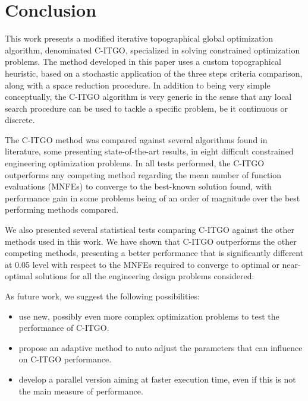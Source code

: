 \section{Conclusion} \label{sec:Conclusion}

This work presents a modified iterative topographical global optimization algorithm, denominated C-ITGO, specialized in solving constrained optimization problems. The method developed in this paper uses a custom topographical heuristic, based on a stochastic application of the three steps criteria comparison, along with a space reduction procedure. In addition to being very simple conceptually, the C-ITGO algorithm is very generic in the sense that any local search procedure can be used to tackle a specific problem, be it continuous or discrete.

The C-ITGO method was compared against several algorithms found in literature, some presenting state-of-the-art results, in eight difficult constrained engineering optimization problems. In all tests performed, the C-ITGO outperforms any competing method regarding the mean number of function evaluations (MNFEs) to converge to the best-known solution found, with performance gain in some problems being of an order of magnitude over the best performing methods compared.

We also presented several statistical tests comparing C-ITGO against the other methods used in this work. We have shown that C-ITGO outperforms the other competing methods, presenting a better performance that is significantly different at 0.05 level with respect to the MNFEs required to converge to optimal or near-optimal solutions for all the engineering design problems considered.

As future work, we suggest the following possibilities:


\begin{itemize}

    \item use new, possibly even more complex optimization problems to test the performance of C-ITGO.

    \item propose an adaptive method to auto adjust the parameters that can influence on C-ITGO performance.

    \item develop a parallel version aiming at faster execution time, even if this is not the main measure of performance.


\end{itemize}